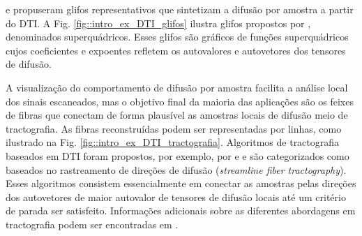 \documentclass[
    12pt,                %
    oneside,            %
    a4paper,            %
    english,            %
    french,                %
    spanish,            %
    brazil                %
    ]{abntex2}
\begin{document}

 e  propuseram glifos representativos que sintetizam a difusão por amostra a partir do DTI. A Fig. \ref{fig::intro_ex_DTI_glifos} ilustra glifos propostos por , denominados superquádricos. Esses glifos são gráficos de funções superquádricos cujos coeficientes e expoentes refletem os autovalores e autovetores dos tensores de difusão.

A visualização do comportamento de difusão por amostra facilita a análise local dos sinais escaneados, mas o objetivo final da maioria das aplicações são os feixes de fibras que conectam de forma plausível as amostras locais de difusão meio de tractografia. As fibras reconstruídas podem ser representadas por linhas, como ilustrado na Fig. \ref{fig::intro_ex_DTI_tractografia}. Algoritmos de tractografia baseados em DTI foram propostos, por exemplo, por  e  e são categorizados como baseados no rastreamento de direções de difusão (\textit{streamline fiber tractography}). Esses algoritmos consistem essencialmente em conectar as amostras pelas direções dos autovetores de maior autovalor de tensores de difusão locais até um critério de parada ser satisfeito. Informações adicionais sobre as diferentes abordagens em tractografia podem ser encontradas em \cite{tournier2011, DTI_Handbook}.
\end{document}
